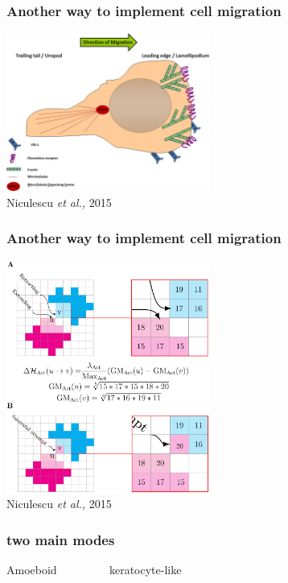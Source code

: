 \documentclass[compress]{beamer}
\begin{document}
\begin{frame}
\frametitle{Another way to implement cell migration}   
\begin{center}
 \includegraphics[width=0.5\textwidth]{figures/actinmigration.jpg}\\
 \tiny Niculescu \textit{et al.,} 2015
\end{center}

\end{frame}

\begin{frame}
\frametitle{Another way to implement cell migration}   
\begin{center}
 \includegraphics[width=0.5\textwidth]{figures/ioana_model.png}\\
 \tiny Niculescu \textit{et al.,} 2015
\end{center}

\end{frame}

\begin{frame}
\frametitle{two main modes} %
\begin{center}
 Amoeboid ~~~~~~~~ keratocyte-like
\end{center}

\end{frame}
\end{document}
